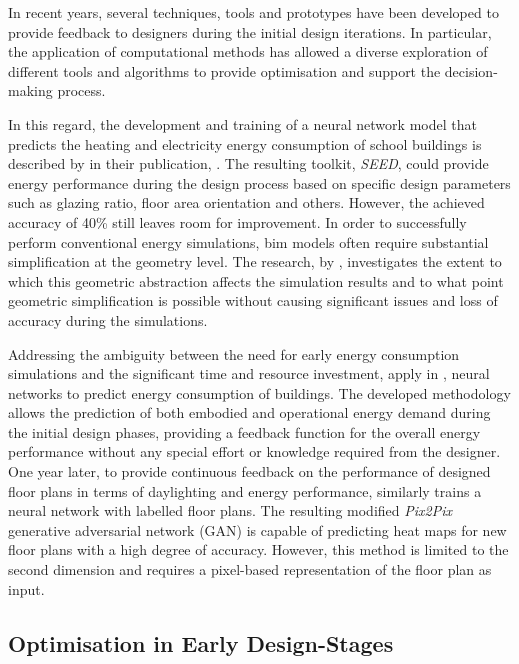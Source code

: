 \documentclass[a4paper, 12pt]{report}
\begin{document}
In recent years, several techniques, tools and prototypes have been developed to provide feedback to designers during the initial design iterations. In particular, the application of computational methods has allowed a diverse exploration of different tools and algorithms to provide optimisation and support the decision-making process.

In this regard, the development and training of a neural network model that predicts the heating and electricity energy consumption of school buildings is described by \citeauthor{paterson2013real} in their publication, . The resulting toolkit, \textit{SEED}, could provide energy performance during the design process based on specific design parameters such as glazing ratio, floor area orientation and others. However, the achieved accuracy of 40\% still leaves room for improvement. In order to successfully perform conventional energy simulations, \acrshort{bim} models often require substantial simplification at the geometry level. The research,  by \citeauthor{chatzivasileiadi2018effect}, investigates the extent to which this geometric abstraction affects the simulation results and to what point geometric simplification is possible without causing significant issues and loss of accuracy during the simulations.

Addressing the ambiguity between the need for early energy consumption simulations and the significant time and resource investment, \citeauthor{singh2020applying} apply in \citeyear{singh2020applying}, neural networks to predict energy consumption of buildings. The developed methodology allows the prediction of both embodied and operational energy demand during the initial design phases, providing a feedback function for the overall energy performance without any special effort or knowledge required from the designer. One year later, to provide continuous feedback on the performance of designed floor plans in terms of daylighting and energy performance, \citeauthor{yousif2021deep} similarly trains a neural network with labelled floor plans. The resulting modified \textit{Pix2Pix} generative adversarial network (GAN) is capable of predicting heat maps for new floor plans with a high degree of accuracy. However, this method is limited to the second dimension and requires a pixel-based representation of the floor plan as input.

\subsection{Optimisation in Early Design-Stages}\label{subsec:optimisation-in-early-design-stages}
\end{document}

